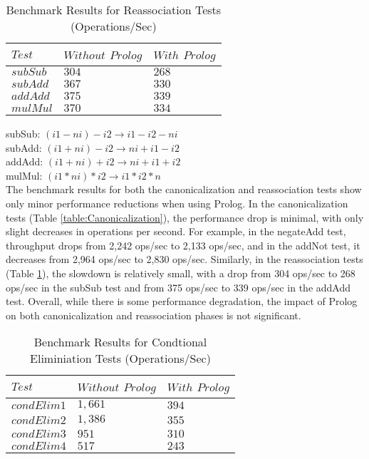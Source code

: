 \begin{table}[h]
    \centering
    \fontsize{9pt}{9pt}
    \begin{tabular}{|l|l|l|}
        \hline
        $Test$ & $Without$ $Prolog$ & $With$ $Prolog$ \\
        \hline
        $subSub$ & $304$ & $268$ \\
        $subAdd$ & $367$ & $330$ \\
        $addAdd$ & $375$ & $339$ \\
        $mulMul$ & $370$ & $334$ \\
        \hline
    \end{tabular}
    \caption{Benchmark Results for Reassociation Tests (Operations/Sec)}
    \label{table:Reassociation}
\end{table}
\smallbreak

\noindent subSub: $(i1 - ni) - i2 \rightarrow i1 - i2 - ni$\\
subAdd: $(i1 + ni) - i2 \rightarrow ni + i1 - i2$\\
addAdd: $(i1 + ni) + i2 \rightarrow ni + i1 + i2$\\
mulMul: $(i1 * ni) * i2 \rightarrow i1 * i2 * n$\\


The benchmark results for both the canonicalization and reassociation tests show only minor performance reductions when using Prolog. 
In the canonicalization tests (Table \ref{table:Canonicalization}), the performance drop is minimal, with only slight decreases in operations per second. 
For example, in the negateAdd test, throughput drops from 2,242 ops/sec to 2,133 ops/sec, and in the addNot test, it decreases from 2,964 ops/sec to 2,830 ops/sec. 
Similarly, in the reassociation tests (Table \ref{table:Reassociation}), the slowdown is relatively small, with a drop from 304 ops/sec to 268 ops/sec in the subSub test and from 375 ops/sec to 339 ops/sec in the addAdd test.
Overall, while there is some performance degradation, the impact of Prolog on both canonicalization and reassociation phases is not significant.

\begin{table}[h]
    \centering
    \fontsize{9pt}{9pt}
    \begin{tabular}{|l|l|l|}
        \hline
        $Test$ & $Without$ $Prolog$ & $With$ $Prolog$ \\
        \hline
        $condElim1$ & $1,661$ & $394$ \\
        $condElim2$ & $1,386$ & $355$ \\
        $condElim3$ & $951$ & $310$ \\
        $condElim4$ & $517$ & $243$ \\
        \hline
    \end{tabular}
    \caption{Benchmark Results for Condtional Eliminiation Tests (Operations/Sec)}
    \label{table:condElimination}
\end{table} 
\smallbreak

